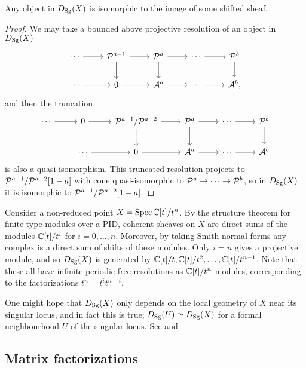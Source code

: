 \begin{proposition}{}{}
    Any object in $D_{\mathrm{Sg}}(X)$ is isomorphic to the image of some shifted sheaf.
\end{proposition}

\begin{proof}
    We may take a bounded above projective resolution of an object in $D_{\mathrm{Sg}}(X)$
    \begin{equation*}
        \begin{tikzcd}
            \cdots \ar[r] & \calP^{a-1} \ar[r] \ar[d] &
            \calP^a \ar[r] \ar[d] & \cdots \ar[r] & \calP^b \ar[d] \\
            \cdots \ar[r] & 0 \ar[r] & \calA^a \ar[r] & \cdots \ar[r] & \calA^b,
        \end{tikzcd}
    \end{equation*}
    and then the truncation
    \begin{equation*}
        \begin{tikzcd}
            \cdots \ar[r] & 0 \ar[r] & \calP^{a-1}/\calP^{a-2} \ar[d] \ar[r] &
            \calP^a \ar[r] \ar[d] & \cdots \ar[r] & \calP^b \ar[d] \\
                & \cdots \ar[r] & 0 \ar[r] &
                \calA^a \ar[r] & \cdots \ar[r] & \calA^b
        \end{tikzcd}
    \end{equation*}
    is also a quasi-isomorphism. This truncated resolution projects to
    $\mathcal{P}^{a-1}/\mathcal{P}^{a-2}[1-a]$ with cone quasi-isomorphic to
    $\mathcal{P}^a\to\cdots\to\mathcal{P}^b$, so in $D_{\mathrm{Sg}}(X)$ it is isomorphic to
    $\mathcal{P}^{a-1}/\mathcal{P}^{a-2}[1-a]$.
\end{proof}

\begin{example}{}{}
    Consider a non-reduced point $X=\operatorname{Spec}\mathbb{C}[t]/t^n$. By the structure theorem
    for finite type modules over a PID, coherent sheaves on $X$ are direct sums
    of the modules $\mathbb{C}[t]/t^i$ for $i=0,\ldots,n$. Moreover, by taking Smith
    normal forms any complex is a direct sum of shifts of these modules. Only
    $i=n$ gives a projective module, and so $D_{\mathrm{Sg}}(X)$ is generated by
    $\mathbb{C}[t]/t,\mathbb{C}[t]/t^2,\ldots,\mathbb{C}[t]/t^{n-1}$. Note that these all have infinite
    periodic free resolutions as $\mathbb{C}[t]/t^n$-modules, corresponding to the
    factorizations $t^n=t^it^{n-i}$.
\end{example}

One might hope that $D_{\mathrm{Sg}}(X)$ only depends on the local geometry of $X$ near
its singular locus, and in fact this is true; $D_{\mathrm{Sg}}(U)\simeq D_{\mathrm{Sg}}(X)$ for a
formal neighbourhood $U$ of the singular locus. See
\cite[Prop~1.14]{OrlovSingularities} and \cite[\S6]{Shipman}.

\subsection{Matrix factorizations}
